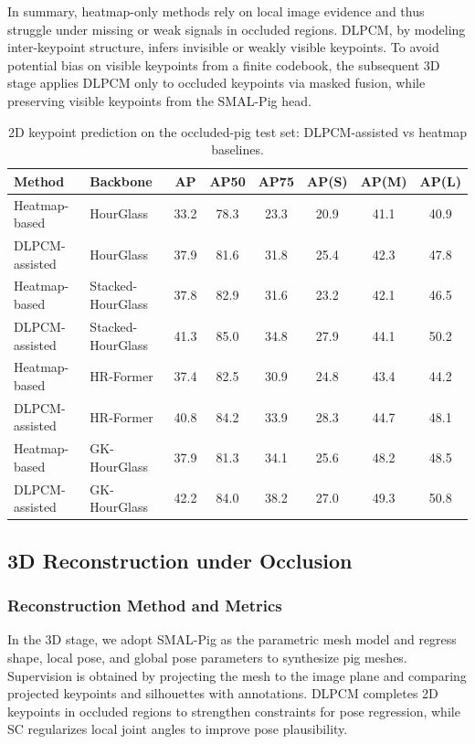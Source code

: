 \documentclass[computers,article,submit,pdftex,moreauthors]{Definitions/mdpi}
\begin{document}
In summary, heatmap-only methods rely on local image evidence and thus struggle under missing or weak signals in occluded regions. DLPCM, by modeling inter-keypoint structure, infers invisible or weakly visible keypoints. To avoid potential bias on visible keypoints from a finite codebook, the subsequent 3D stage applies DLPCM only to occluded keypoints via masked fusion, while preserving visible keypoints from the SMAL-Pig head.

\begin{table}[H]
\caption{2D keypoint prediction on the occluded-pig test set: DLPCM-assisted vs heatmap baselines.}
\label{tab:2d_keypoint}
\centering
\small
\setlength{\tabcolsep}{4.5pt}
\begin{tabular}{llcccccc}
\toprule
\textbf{Method} & \textbf{Backbone} & \textbf{AP} & \textbf{AP50} & \textbf{AP75} & \textbf{AP(S)} & \textbf{AP(M)} & \textbf{AP(L)} \\
\midrule
Heatmap-based & HourGlass & 33.2 & 78.3 & 23.3 & 20.9 & 41.1 & 40.9 \\
DLPCM-assisted & HourGlass & 37.9 & 81.6 & 31.8 & 25.4 & 42.3 & 47.8 \\
Heatmap-based & Stacked-HourGlass & 37.8 & 82.9 & 31.6 & 23.2 & 42.1 & 46.5 \\
DLPCM-assisted & Stacked-HourGlass & 41.3 & 85.0 & 34.8 & 27.9 & 44.1 & 50.2 \\
Heatmap-based & HR-Former & 37.4 & 82.5 & 30.9 & 24.8 & 43.4 & 44.2 \\
DLPCM-assisted & HR-Former & 40.8 & 84.2 & 33.9 & 28.3 & 44.7 & 48.1 \\
Heatmap-based & GK-HourGlass & 37.9 & 81.3 & 34.1 & 25.6 & 48.2 & 48.5 \\
DLPCM-assisted & GK-HourGlass & 42.2 & 84.0 & 38.2 & 27.0 & 49.3 & 50.8 \\
\bottomrule
\end{tabular}
\end{table}

\subsection{3D Reconstruction under Occlusion}\label{sec:3d_recon}

\subsubsection{Reconstruction Method and Metrics}\label{sec:3d_method}

In the 3D stage, we adopt SMAL-Pig as the parametric mesh model and regress shape, local pose, and global pose parameters to synthesize pig meshes. Supervision is obtained by projecting the mesh to the image plane and comparing projected keypoints and silhouettes with annotations. DLPCM completes 2D keypoints in occluded regions to strengthen constraints for pose regression, while SC regularizes local joint angles to improve pose plausibility.
\end{document}
